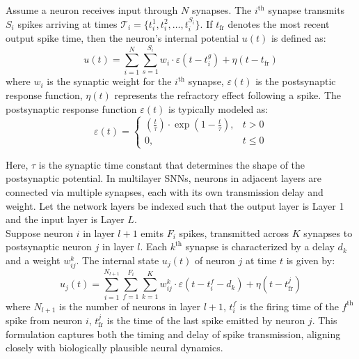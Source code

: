 \noindent Assume a neuron receives input through $N$ synapses. The $i^{\text{th}}$ synapse transmits $S_i$ spikes arriving at times $\mathcal{T}_i = \{t^1_i, t^2_i, \dots, t^{S_i}_i\}$. If $t_{\text{fr}}$ denotes the most recent output spike time, then the neuron's internal potential $u(t)$ is defined as:
\begin{equation}
    u(t) = \sum_{i=1}^{N} \sum_{s=1}^{S_i} w_i \cdot \varepsilon(t - t^g_i) + \eta(t - t_{\text{fr}})
    \label{eq:6.1}
\end{equation}
where $w_i$ is the synaptic weight for the $i^{\text{th}}$ synapse, $\varepsilon(t)$ is the postsynaptic response function, $\eta(t)$ represents the refractory effect following a spike. The postsynaptic response function $\varepsilon(t)$ is typically modeled as:
\begin{equation}
    \varepsilon(t) =
    \begin{cases}
    \left(\frac{t}{\tau}\right) \cdot \exp\left(1 - \frac{t}{\tau}\right), & t > 0 \\
    0, & t \leq 0
    \end{cases}
    \label{eq:6.2}
\end{equation}

\noindent Here, $\tau$ is the synaptic time constant that determines the shape of the postsynaptic potential. In multilayer SNNs, neurons in adjacent layers are connected via multiple synapses, each with its own transmission delay and weight. Let the network layers be indexed such that the output layer is Layer 1 and the input layer is Layer $L$. \\

\noindent Suppose neuron $i$ in layer $l+1$ emits $F_i$ spikes, transmitted across $K$ synapses to postsynaptic neuron $j$ in layer $l$. Each $k^{\text{th}}$ synapse is characterized by a delay $d_k$ and a weight $w^k_{ij}$. The internal state $u_j(t)$ of neuron $j$ at time $t$ is given by:
\begin{equation}
    u_j(t) = \sum_{i=1}^{N_{l+1}} \sum_{f=1}^{F_i} \sum_{k=1}^{K} w^k_{ij} \cdot \varepsilon(t - t^f_i - d_k) + \eta(t - t^j_{\text{fr}})
    \label{eq:6.3}
\end{equation}
where $N_{l+1}$ is the number of neurons in layer $l+1$, $t^f_i$ is the firing time of the $f^{\text{th}}$ spike from neuron $i$, $t^j_{\text{fr}}$ is the time of the last spike emitted by neuron $j$. This formulation captures both the timing and delay of spike transmission, aligning closely with biologically plausible neural dynamics.\\

